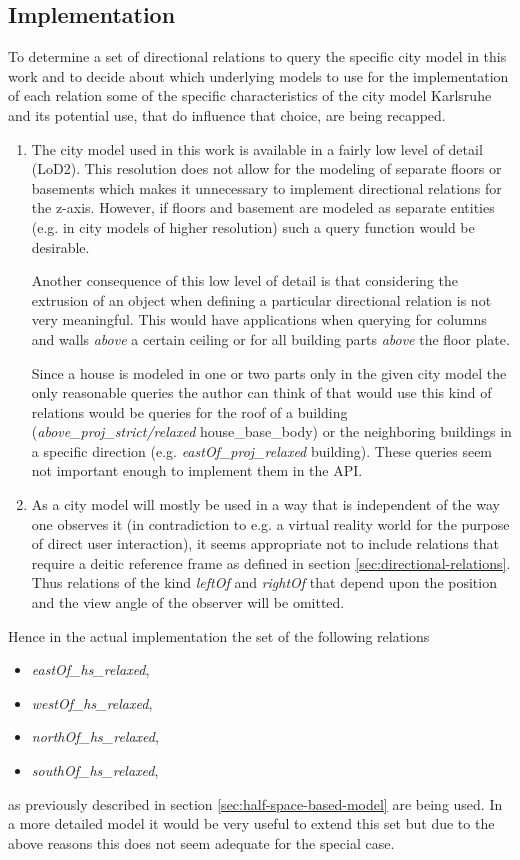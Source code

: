 \documentclass[paper=a4, fontsize=11pt]{scrartcl} %
\numberwithin{equation}{section} %
\numberwithin{figure}{section} %
\numberwithin{table}{section} %
\begin{document}
\subsection{Implementation}
To determine a set of directional relations to query the specific city model in this work and to decide about which underlying models to use for the implementation of each relation some of the specific characteristics of the city model Karlsruhe and its potential use, that do influence that choice, are being recapped.  

\begin{enumerate}
\item The city model used in this work is available in a fairly low level of detail (LoD2). This resolution does not allow for the modeling of separate floors or basements which makes it unnecessary to implement directional relations for the z-axis. However, if floors and basement are modeled as separate entities (e.g. in city models of higher resolution) such a query function would be desirable.

Another consequence of this low level of detail is that considering the extrusion of an object when defining a particular directional relation is not very meaningful. This would have applications when querying for columns and walls \emph{above} a certain ceiling or for all building parts \emph{above} the floor plate. 

Since a house is modeled in one or two parts only in the given city model the only reasonable queries the author can think of that would use this kind of relations would be queries for the roof of a building (\textit{above\_proj\_strict/relaxed} house\_base\_body) or the neighboring buildings in a specific direction (e.g. \textit{eastOf\_proj\_relaxed} building). These queries seem not important enough to implement them in the API.

\item  As a city model will mostly be used in a way that is independent of the way one observes it (in contradiction to e.g. a virtual reality world for the purpose  of direct user interaction), it seems appropriate not to include relations that require a deitic reference frame as defined in section \ref{sec:directional-relations}. Thus relations of the kind \emph{leftOf} and \emph{rightOf} that depend upon the position and the view angle of the observer will be omitted.
\end{enumerate}

Hence in the actual implementation the set of the following relations
\begin{itemize}
\item \textit{eastOf\_hs\_relaxed},
\item \textit{westOf\_hs\_relaxed},
\item \textit{northOf\_hs\_relaxed},
\item \textit{southOf\_hs\_relaxed},
\end{itemize}
as previously described in section \ref{sec:half-space-based-model} are being used. In a more detailed model it would be very useful to extend this set but due to the above reasons this does not seem adequate for the special case. 
\end{document}
